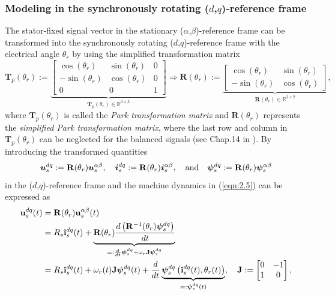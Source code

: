 \subsubsection{Modeling in the synchronously rotating ($d$,$q$)-reference frame}
The stator-fixed signal vector in the stationary ($\alpha$,$\beta$)-reference frame can be transformed into the synchronously rotating ($d$,$q$)-reference frame with the electrical angle $\theta_r$ by using the simplified transformation matrix
\begin{equation}\label{eqn:2.8}
\mathbf{T}_p(\theta_r) := 
    \underbrace{\begin{bmatrix}
     \cos(\theta_r) & \sin(\theta_r) & 0\\
     -\sin(\theta_r) & \cos(\theta_r) & 0\\
     0 & 0 & 1
    \end{bmatrix}}_{\mathbf{T}_p(\theta_r) \in \mathbb{R}^{3\times3}} \Rightarrow \mathbf{R}(\theta_r) := 
    \underbrace{\begin{bmatrix}
     \cos(\theta_r) & \sin(\theta_r)\\
     -\sin(\theta_r) & \cos(\theta_r)
    \end{bmatrix}}_{\mathbf{R}(\theta_r) \in \mathbb{R}^{2\times2}}, 
\end{equation}
where $\mathbf{T}_p(\theta_r)$ is called the \emph{Park transformation matrix} and $\mathbf{R}(\theta_r)$ represents the \emph{simplified Park transformation matrix}, where the last row and column in $\mathbf{T}_p(\theta_r)$ can be neglected for the balanced signals (see Chap.14 in \cite{c2.1_3}). By introducing the transformed quantities 
\begin{equation}\notag
 \bm{u}_s^{dq} := \mathbf{R}(\theta_r)\bm{u}_s^{\alpha\beta}, \quad \bm{i}_s^{dq} := \mathbf{R}(\theta_r) \bm{i}_s^{\alpha\beta}, \quad \text{and} \quad \bm{\psi}_s^{dq} := \mathbf{R}(\theta_r) \bm{\psi}_s^{\alpha\beta}
\end{equation}
in the ($d$,$q$)-reference frame and the machine dynamics in (\ref{eqn:2.5}) can be expressed as 
\begin{align}\label{eqn:2.9}\notag
\mathbf{u}^{dq}_s(t) &= \mathbf{R}(\theta_r)\mathbf{u}^{\alpha\beta}_s(t) \\\notag
&= R_s\mathbf{i}^{dq}_s(t) + \underbrace{\mathbf{R}(\theta_r)\frac{d\left( \mathbf{R}^{-1}(\theta_r)\boldsymbol{\psi}^{dq}_s\right)}{dt}}_{=:\frac{d}{dt}\boldsymbol{\psi}^{dq}_s + \omega_r \mathbf{J}\boldsymbol{\psi}^{dq}_s} \\
&= R_s \mathbf{i}^{dq}_s(t) +\omega_r(t)\mathbf{J}\boldsymbol{\psi}^{dq}_s(t) + \frac{d}{dt}\underbrace{\boldsymbol{\psi}^{dq}_s\left(\mathbf{i}^{dq}_s(t),\theta_r(t) \right)}_{=:\boldsymbol{\psi}^{dq}_s(t)}, \quad \mathbf{J} :=  
  \begin{bmatrix}
    0 & -1\\1 & 0
  \end{bmatrix}, 
\end{align}
